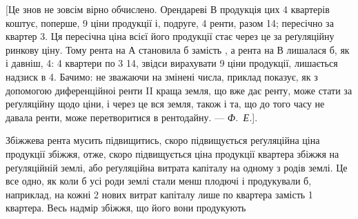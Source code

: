 [Це знов не зовсім вірно обчислено. Орендареві $В$ продукція цих 4 квартерів
коштує, поперше, 9 ціни продукції і, подруге,
4 ренти, разом 14; пересічно за квартер 3.
Ця пересічна ціна всієї його продукції стає через це за реґуляційну ринкову ціну. Тому рента на
$А$ становила б  замість , а рента на $В$ лишалася б, як і давніш, 4: 4 квартери по 3 \deq{} 14, звідси вирахувати
9 ціни продукції, лишається надзиск в 4. Бачимо: не
зважаючи на змінені числа, приклад показує, як з допомогою диференційноі
ренти II краща земля, що вже дає ренту, може стати за реґуляційну щодо ціни,
і через це вся земля, також і та, що до того часу не давала ренти, може перетворитися
в рентодайну. — \emph{Ф.~Е.}].

Збіжжева рента мусить підвищитись, скоро підвищується реґуляційна
ціна продукції збіжжя, отже, скоро підвищується ціна продукції квартера збіжжя
на реґуляційній землі, або реґуляційна витрата капіталу на одному з родів
землі. Це все одно, як коли б усі роди землі стали менш плодючі і продукували
б, наприклад, на кожні 2 нових витрат капіталу лише по 
квартера замість 1 квартера. Весь надмір збіжжя, що його вони продукують
\parbreak{}  %
